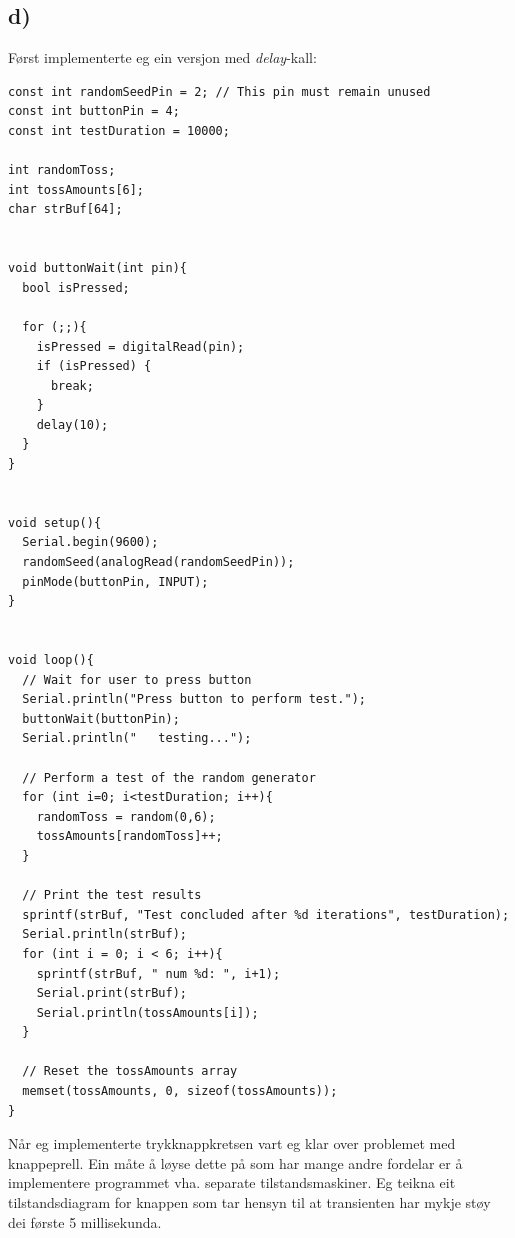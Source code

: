 \documentclass[12pt,a4paper]{article}
\begin{document}
    \subsection*{d)}
    Først implementerte eg ein versjon med \textit{delay}-kall:
    \begin{lstlisting}[language=Arduino, basicstyle=\tiny]
const int randomSeedPin = 2; // This pin must remain unused
const int buttonPin = 4;
const int testDuration = 10000;

int randomToss;
int tossAmounts[6];
char strBuf[64];


void buttonWait(int pin){
  bool isPressed;
  
  for (;;){
    isPressed = digitalRead(pin);
    if (isPressed) {
      break;
    }
    delay(10);
  }
}


void setup(){
  Serial.begin(9600);  
  randomSeed(analogRead(randomSeedPin));
  pinMode(buttonPin, INPUT);
}


void loop(){
  // Wait for user to press button
  Serial.println("Press button to perform test.");
  buttonWait(buttonPin);
  Serial.println("   testing...");
  
  // Perform a test of the random generator
  for (int i=0; i<testDuration; i++){
    randomToss = random(0,6);
    tossAmounts[randomToss]++;
  }
  
  // Print the test results
  sprintf(strBuf, "Test concluded after %d iterations", testDuration);
  Serial.println(strBuf);
  for (int i = 0; i < 6; i++){
    sprintf(strBuf, " num %d: ", i+1);
    Serial.print(strBuf);
    Serial.println(tossAmounts[i]);
  }
  
  // Reset the tossAmounts array
  memset(tossAmounts, 0, sizeof(tossAmounts));
}
    \end{lstlisting}
    Når eg implementerte trykknappkretsen vart eg klar over problemet med knappeprell.
    Ein måte å løyse dette på som har mange andre fordelar er å implementere programmet
    vha. separate tilstandsmaskiner. Eg teikna eit tilstandsdiagram for knappen som tar
    hensyn til at transienten har mykje støy dei første 5 millisekunda.
\end{document}

